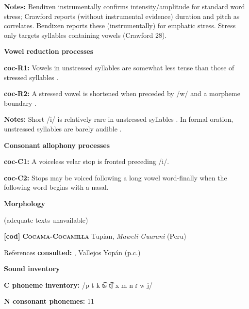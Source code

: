 \textbf{Notes:} Bendixen instrumentally confirms intensity/amplitude for standard word stress; Crawford reports (without instrumental evidence) duration and pitch as correlates. Bendixen reports these (instrumentally) for emphatic stress. Stress only targets syllables containing vowels (Crawford 28).



\textbf{Vowel reduction processes}



\textbf{coc-R1:} Vowels in unstressed syllables are somewhat less tense than those of stressed syllables \citep[22]{Crawford1966}.



\textbf{coc-R2:} A stressed vowel is shortened when preceded by /w/ and a morpheme boundary \citep[67]{Bendixen1980}.



\textbf{Notes:} Short /i/ is relatively rare in unstressed syllables \citep[32]{Crawford1966}. In formal oration, unstressed syllables are barely audible \citep[332-3]{Bendixen1980}.



\textbf{Consonant allophony processes}



\textbf{coc-C1:} A voiceless velar stop is fronted preceding /i/. \citep[15]{Crawford1966}



\textbf{coc-C2:} Stops may be voiced following a long vowel word-finally when the following word begins with a nasal. \citep[99-100]{Bendixen1980}



\textbf{Morphology}



(adequate texts unavailable)



\textbf{[cod]}   \textbf{\textsc{Cocama-Cocamilla}}  Tupian, \textit{Maweti-Guarani} (Peru)



References \textbf{consulted:}  \citet{VallejosYopán2010}, Vallejos Yopán (p.c.)



\textbf{Sound inventory}



\textbf{C phoneme inventory:} /p t k t͡s t͡ʃ x m n ɾ w j/



\textbf{N consonant phonemes:} 11



